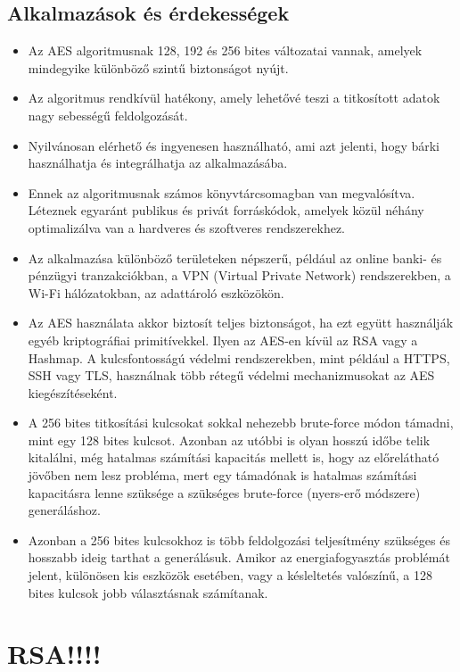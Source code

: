 \subsection{Alkalmazások és érdekességek}

\begin{itemize}
	\item Az AES algoritmusnak 128, 192 és 256 bites változatai vannak, amelyek mindegyike különböző szintű biztonságot nyújt.
	\item Az algoritmus rendkívül hatékony, amely lehetővé teszi a titkosított adatok nagy sebességű feldolgozását.
	\item Nyilvánosan elérhető és ingyenesen használható, ami azt jelenti, hogy bárki használhatja és integrálhatja az alkalmazásába.
	\item Ennek az algoritmusnak számos könyvtárcsomagban van megvalósítva. Léteznek egyaránt publikus és privát forráskódok, amelyek közül néhány optimalizálva van a hardveres és szoftveres rendszerekhez.
	\item Az alkalmazása különböző területeken népszerű, például az online banki- és pénzügyi tranzakciókban, a VPN (Virtual Private Network) rendszerekben, a Wi-Fi hálózatokban, az adattároló eszközökön.
	\item Az AES használata akkor biztosít teljes biztonságot, ha ezt együtt használják egyéb kriptográfiai primitívekkel. Ilyen az AES-en kívül az RSA vagy a Hashmap. A kulcsfontosságú védelmi rendszerekben, mint például a HTTPS, SSH vagy TLS, használnak több rétegű védelmi mechanizmusokat az AES kiegészítéseként.
	\item A 256 bites titkosítási kulcsokat sokkal nehezebb brute-force módon támadni, mint egy 128 bites kulcsot. Azonban az utóbbi is olyan hosszú időbe telik kitalálni, még hatalmas számítási kapacitás mellett is, hogy az előrelátható jövőben nem lesz probléma, mert egy támadónak is hatalmas számítási kapacitásra lenne szüksége a szükséges brute-force (nyers-erő módszere) generáláshoz.
	\item Azonban a 256 bites kulcsokhoz is több feldolgozási teljesítmény szükséges és hosszabb ideig tarthat a generálásuk. Amikor az energiafogyasztás problémát jelent, különösen kis eszközök esetében, vagy a késleltetés valószínű, a 128 bites kulcsok jobb választásnak számítanak.
\end{itemize}

\section {RSA!!!!}

